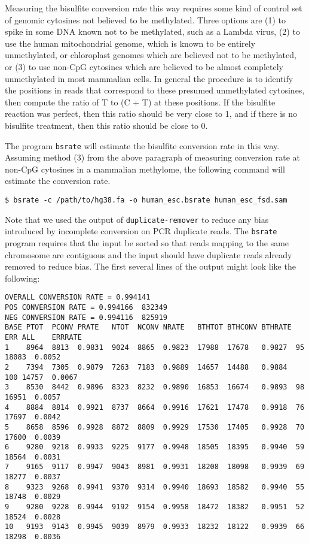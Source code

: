 \documentclass[10pt]{article}
\newcommand{\prog}[1]{\texttt{#1}}
\begin{document}
Measuring the bisulfite conversion rate this way requires some kind of
control set of genomic cytosines not believed to be methylated. Three
options are (1) to spike in some DNA known not to be methylated, such
as a Lambda virus, (2) to use the human mitochondrial genome, which
is known to be entirely unmethylated, or chloroplast genomes
which are believed not to be methylated, or (3) to use non-CpG cytosines
which are believed to be almost completely unmethylated in most
mammalian cells. In general the procedure is to identify the positions
in reads that correspond to these presumed unmethylated cytosines,
then compute the ratio of T to (C + T) at these positions. If the
bisulfite reaction was perfect, then this ratio should be very close
to 1, and if there is no bisulfite treatment, then this ratio should
be close to 0.

The program \prog{bsrate} will estimate the bisulfite conversion rate
in this way. Assuming method (3) from the above paragraph of measuring
conversion rate at non-CpG cytosines in a mammalian methylome, the
following command will estimate the conversion rate.

\begin{verbatim}
$ bsrate -c /path/to/hg38.fa -o human_esc.bsrate human_esc_fsd.sam
\end{verbatim}

Note that we used the output of \prog{duplicate-remover} to reduce any
bias introduced by incomplete conversion on PCR duplicate reads. The
\prog{bsrate} program requires that the input be sorted so that
reads mapping to the same chromosome are contiguous and the input should
have duplicate reads already removed to reduce bias. The first several
lines of the output might look like the following:

{\small{%
\begin{verbatim}
OVERALL CONVERSION RATE = 0.994141
POS CONVERSION RATE = 0.994166  832349
NEG CONVERSION RATE = 0.994116  825919
BASE PTOT  PCONV PRATE   NTOT  NCONV NRATE   BTHTOT BTHCONV BTHRATE ERR ALL    ERRRATE
1    8964  8813  0.9831  9024  8865  0.9823  17988  17678   0.9827  95  18083  0.0052
2    7394  7305  0.9879  7263  7183  0.9889  14657  14488   0.9884  100 14757  0.0067
3    8530  8442  0.9896  8323  8232  0.9890  16853  16674   0.9893  98  16951  0.0057
4    8884  8814  0.9921  8737  8664  0.9916  17621  17478   0.9918  76  17697  0.0042
5    8658  8596  0.9928  8872  8809  0.9929  17530  17405   0.9928  70  17600  0.0039
6    9280  9218  0.9933  9225  9177  0.9948  18505  18395   0.9940  59  18564  0.0031
7    9165  9117  0.9947  9043  8981  0.9931  18208  18098   0.9939  69  18277  0.0037
8    9323  9268  0.9941  9370  9314  0.9940  18693  18582   0.9940  55  18748  0.0029
9    9280  9228  0.9944  9192  9154  0.9958  18472  18382   0.9951  52  18524  0.0028
10   9193  9143  0.9945  9039  8979  0.9933  18232  18122   0.9939  66  18298  0.0036
\end{verbatim}%
}}
\end{document}
